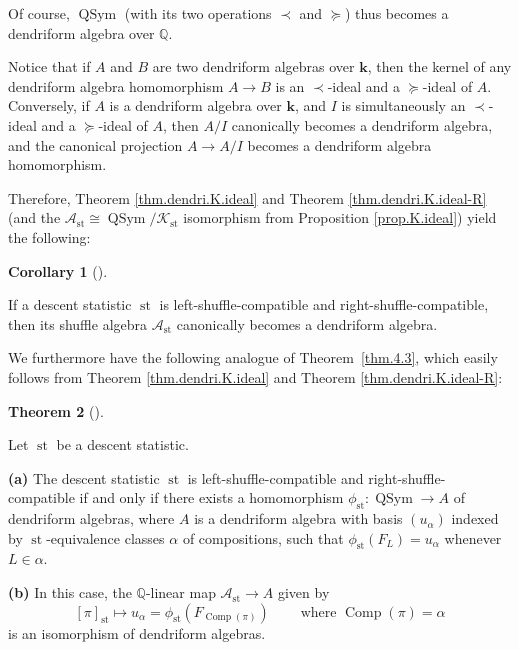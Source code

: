 \documentclass[numbers=enddot,12pt,final,onecolumn,notitlepage]{scrartcl}%
\theoremstyle{definition}
\newtheorem{theo}{Theorem}[section]
\newenvironment{theorem}[1][]
{\begin{theo}[#1]\begin{leftbar}}
{\end{leftbar}\end{theo}}
\newtheorem{coro}[theo]{Corollary}
\newenvironment{corollary}[1][]
{\begin{coro}[#1]\begin{leftbar}}
{\end{leftbar}\end{coro}}
\begin{document}
Of course, $\operatorname*{QSym}$ (with its two operations $\left.
\prec\right.  $ and $\left.  \succeq\right.  $) thus becomes a dendriform
algebra over $\mathbb{Q}$.

Notice that if $A$ and $B$ are two dendriform algebras over $\mathbf{k}$, then
the kernel of any dendriform algebra homomorphism $A\rightarrow B$ is an
$\left.  \prec\right.  $-ideal and a $\left.  \succeq\right.  $-ideal of $A$.
Conversely, if $A$ is a dendriform algebra over $\mathbf{k}$, and $I$ is
simultaneously an $\left.  \prec\right.  $-ideal and a $\left.  \succeq
\right.  $-ideal of $A$, then $A/I$ canonically becomes a dendriform algebra,
and the canonical projection $A\rightarrow A/I$ becomes a dendriform algebra homomorphism.

Therefore, Theorem \ref{thm.dendri.K.ideal} and Theorem
\ref{thm.dendri.K.ideal-R} (and the $\mathcal{A}_{\operatorname*{st}}%
\cong\operatorname*{QSym}/\mathcal{K}_{\operatorname*{st}}$ isomorphism from
Proposition \ref{prop.K.ideal}) yield the following:

\begin{corollary}
\label{cor.dendri.quotient-dendri}If a descent statistic $\operatorname*{st}$
is left-shuffle-compatible and right-shuffle-compatible, then its shuffle
algebra $\mathcal{A}_{\operatorname*{st}}$ canonically becomes a dendriform algebra.
\end{corollary}

We furthermore have the following analogue of Theorem~\ref{thm.4.3}, which
easily follows from Theorem \ref{thm.dendri.K.ideal} and Theorem
\ref{thm.dendri.K.ideal-R}:

\begin{theorem}
\label{thm.dendri.4.3}Let $\operatorname*{st}$ be a descent statistic.

\textbf{(a)} The descent statistic $\operatorname*{st}$ is
left-shuffle-compatible and right-shuffle-compatible if and only if there
exists a homomorphism $\phi_{\operatorname*{st}}:\operatorname*{QSym}%
\rightarrow A$ of dendriform algebras, where $A$ is a dendriform algebra with
basis $\left(  u_{\alpha}\right)  $ indexed by $\operatorname*{st}%
$-equivalence classes $\alpha$ of compositions, such that $\phi
_{\operatorname*{st}}\left(  F_{L}\right)  =u_{\alpha}$ whenever $L\in\alpha$.

\textbf{(b)} In this case, the $\mathbb{Q}$-linear map $\mathcal{A}%
_{\operatorname*{st}}\rightarrow A$ given by%
\[
\left[  \pi\right]  _{\operatorname*{st}}\mapsto u_{\alpha}=\phi
_{\operatorname*{st}}\left(  F_{\operatorname*{Comp}\left(  \pi\right)
}\right)  \ \ \ \ \ \ \ \ \ \ \text{where }\operatorname*{Comp}\left(
\pi\right)  =\alpha
\]
is an isomorphism of dendriform algebras.
\end{theorem}
\end{document}
